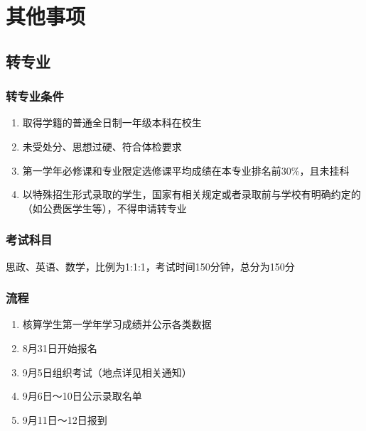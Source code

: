\section[其他事项]{其他事项}

\subsection[转专业]{转专业\footnotemark}

\subsubsection[转专业条件]{转专业条件}
\begin{enumerate}
    \item 取得学籍的普通全日制一年级本科在校生
    \item 未受处分、思想过硬、符合体检要求
    \item 第一学年必修课和专业限定选修课平均成绩在本专业排名前30\%，且未挂科
    \item 以特殊招生形式录取的学生，国家有相关规定或者录取前与学校有明确约定的（如公费医学生等），不得申请转专业
\end{enumerate}

\subsubsection[考试科目]{考试科目}
思政、英语\footnotemark、数学，比例为1:1:1，考试时间150分钟，总分为150分

\subsubsection[流程]{流程}
\begin{enumerate}
    \item 核算学生第一学年学习成绩并公示各类数据
    \item 8月31日开始报名
    \item 9月5日组织考试（地点详见相关通知）
    \item 9月6日～10日公示录取名单\footnotemark
    \item 9月11日～12日报到
\end{enumerate}

